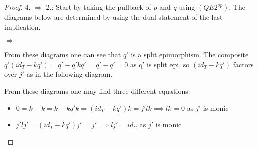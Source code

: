 \begin{proof}
        4. $\Rightarrow$ 2.: Start by taking the pullback of $p$ and $q$ using $(QE2^{op})$. The diagrams below are determined by using the dual statement of the last implication.
        \begin{center}
            \space $\Rightarrow$
        \end{center}
        From these diagrams one can see that $q'$ is a split epimorphism. The composite $q'(id_T-kq')=q'-q'kq'=q'-q'=0$ as q' is split epi, so $(id_T-kq')$ factors over $j'$ as in the following diagram.
        \begin{center}
        \end{center}
        From these diagrams one may find three different equations:
        \begin{itemize}
            \item $0=k-k=k-kq'k=(id_T-kq')k=j'lk \implies lk=0$ as $j'$ is monic
            \item $j'lj'=(id_T-kq')j'=j'\implies lj'=id_C$ as $j'$ is monic

\end{itemize}
\end{proof}
